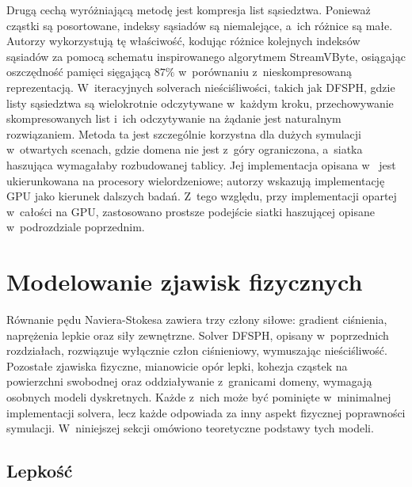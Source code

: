 Drugą cechą wyróżniającą metodę jest kompresja list sąsiedztwa. Ponieważ
cząstki są posortowane, indeksy sąsiadów są niemalejące, a~ich różnice
są małe. Autorzy wykorzystują tę właściwość, kodując różnice kolejnych
indeksów sąsiadów za pomocą schematu inspirowanego algorytmem StreamVByte,
osiągając oszczędność pamięci sięgającą $87\%$ w~porównaniu z~nieskompresowaną
reprezentacją. W~iteracyjnych solverach nieściśliwości, takich jak DFSPH,
gdzie listy sąsiedztwa są wielokrotnie odczytywane w~każdym kroku, przechowywanie
skompresowanych list i~ich odczytywanie na żądanie jest naturalnym rozwiązaniem.
Metoda ta jest szczególnie korzystna dla dużych symulacji w~otwartych scenach,
gdzie domena nie jest z~góry ograniczona, a~siatka haszująca wymagałaby rozbudowanej
tablicy. Jej implementacja opisana w~\cite{band2019compressed} jest ukierunkowana
na procesory wielordzeniowe; autorzy wskazują implementację GPU jako kierunek
dalszych badań. Z~tego względu, przy implementacji opartej w~całości na GPU,
zastosowano prostsze podejście siatki haszującej opisane w~podrozdziale poprzednim.


\section{Modelowanie zjawisk fizycznych}
\label{sec:physical_models_theory}

Równanie pędu Naviera-Stokesa zawiera trzy człony siłowe: gradient ciśnienia,
naprężenia lepkie oraz siły zewnętrzne. Solver DFSPH, opisany w~poprzednich
rozdziałach, rozwiązuje wyłącznie człon ciśnieniowy, wymuszając nieściśliwość.
Pozostałe zjawiska fizyczne, mianowicie opór lepki, kohezja cząstek na
powierzchni swobodnej oraz oddziaływanie z~granicami domeny, wymagają osobnych
modeli dyskretnych. Każde z~nich może być pominięte w~minimalnej implementacji
solvera, lecz każde odpowiada za inny aspekt fizycznej poprawności symulacji.
W~niniejszej sekcji omówiono teoretyczne podstawy tych modeli.

\subsection{Lepkość}

